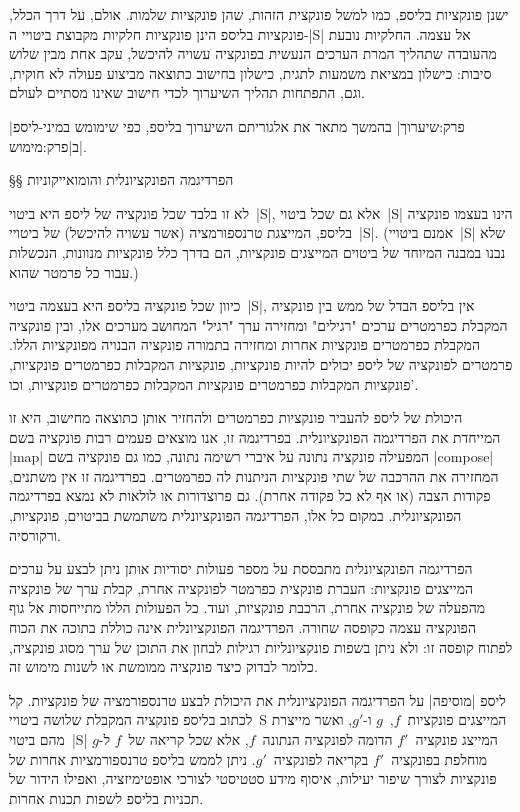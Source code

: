 ישנן פונקציות בליספ, כמו למשל פונקצית הזהות, שהן פונקציות שלמות. אולם, על דרך
הכלל, פונקציות בליספ הינן פונקציות חלקיות מקבוצת ביטויי ה-\E|S| אל עצמה.
החלקיות נובעת מהעובדה שתהליך המרת הערכים הנעשית בפונקציה עשויה להיכשל, עקב אחת
מבין שלוש סיבות: כישלון במציאת משמעות לתגית, כישלון בחישוב כתוצאה מביצוע פעולה
לא חוקית, וגם, התפתחות תהליך השיערוך לכדי חישוב שאינו מסתיים לעולם.

|פרק:שיערוך| בהמשך מתאר את אלגוריתם השיערוך בליספ, כפי שימומש
במיני-ליספ ב|פרק:מימוש|.

§§ הפרדיגמה הפונקציונלית והומואייקוניות

לא זו בלבד שכל פונקציה של ליספ היא ביטוי~\E|S|, אלא גם שכל ביטוי~\E|S| הינו
בעצמו פונקציה בליספ, המייצגת טרנספורמציה (אשר עשויה להיכשל) של ביטויי~\E|S|.
(אמנם ביטויי~\E|S| שלא נבנו במבנה המיוחד של ביטוים המייצגים פונקציות, הם בדרך
כלל פונקציות מנוונות, הנכשלות עבור כל פרמטר שהוא.)

כיוון שכל פונקציה בליספ היא בעצמה ביטוי~\E|S|, אין בליספ הבדל של ממש בין
פונקציה המקבלת כפרמטרים ערכים "רגילים" ומחזירה ערך "רגיל" המחושב מערכים אלו,
ובין פונקציה המקבלת כפרמטרים פונקציות אחרות ומחזירה בתמורה פונקציה הבנויה
מפונקציות הללו. פרמטרים לפונקציה של ליספ יכולים להיות פונקציות, פונקציות
המקבלות כפרמטרים פונקציות, פונקציות המקבלות כפרמטרים פונקציות המקבלות כפרמטרים
פונקציות, וכו'.

היכולת של ליספ להעביר פונקציות כפרמטרים ולהחזיר אותן כתוצאה מחישוב, היא זו
המייחדת את הפרדיגמה הפונקציונלית. בפרדיגמה זו, אנו מוצאים פעמים רבות פונקציה
בשם \E|map| המפעילה פונקציה נתונה על איברי רשימה נתונה, כמו גם פונקציה בשם
\E|compose| המחזירה את ההרכבה של שתי פונקציות הניתנות לה כפרמטרים. בפרדיגמה זו
אין משתנים, פקודות הצבה (או אף לא כל פקודה אחרת). גם פרוצדורות או
לולאות לא נמצא בפרדיגמה הפונקציונלית. במקום כל אלו, הפרדיגמה הפונקציונלית
משתמשת בביטוים, פונקציות, ורקורסיה.

הפרדיגמה הפונקציונלית מתבססת על מספר פעולות יסודיות אותן ניתן לבצע על ערכים
המייצגים פונקציות: העברת פונקצית כפרמטר לפונקציה אחרת, קבלת ערך של פונקציה
מהפעלה של פונקציה אחרת, הרכבת פונקציות, ועוד. כל הפעולות הללו מתייחסות אל גוף
הפונקציה עצמה כקופסה שחורה. הפרדיגמה הפונקציונלית אינה כוללת בתוכה את הכוח
לפתוח קופסה זו: ולא ניתן בשפות פונקציונליות רגילות לבחון את התוכן של ערך מסוג
פונקציה, כלומר לבדוק כיצד פונקציה ממומשת או לשנות מימוש זה.

ליספ \ע|מוסיפה| על הפרדיגמה הפונקציונלית את היכולת לבצע טרנספורמציה של
פונקציות. קל לכתוב בליספ פונקציה המקבלת שלושה ביטויי~S המייצגים
פונקציות~$f$,~$g$ ו-$g'$, ואשר מייצרת מהם ביטוי~\E|S| המייצג פונקציה~$f'$ הדומה
לפונקציה הנתונה~$f$, אלא שכל קריאה של~$f$ ל-$g$ מוחלפת בפונקציה~$f'$ בקריאה
לפונקציה~$g'$. ניתן לממש בליספ טרנספורמציות אחרות של פונקציות לצורך שיפור
יעילות, איסוף מידע סטטיסטי לצורכי אופטימיזציה, ואפילו הידור של תכניות בליספ
לשפות תכנות אחרות.

